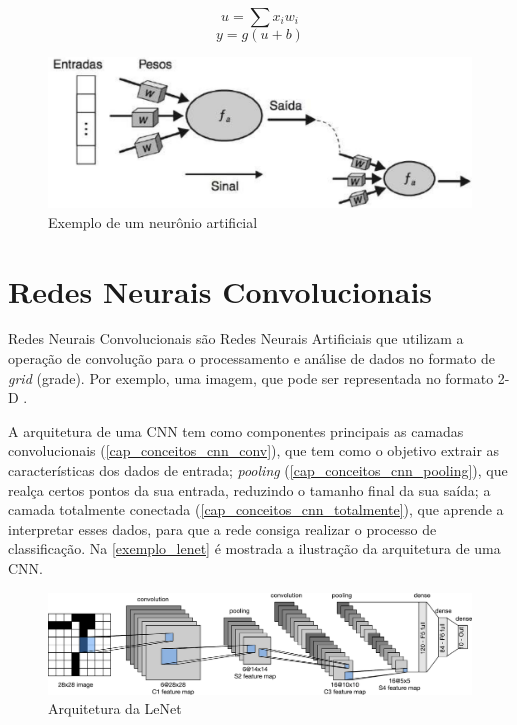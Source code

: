 \begin{equation}\label{eq_neuronio}
u = \sum x_i w_i
\end{equation}
\begin{equation}\label{eq_ativacao}
y = g(u + b)
\end{equation}

\begin{figure}[htb]
	\begin{center}
		\includegraphics[scale=0.3]{Imagens/exemplo_neuronio_artificial}
	\end{center}
	\caption {\label{cap_conceitos_ex_neuronio} Exemplo de um neurônio artificial}
\end{figure}

\section{Redes Neurais Convolucionais}\label{cap_conceitos_cnn}
Redes Neurais Convolucionais são Redes Neurais Artificiais que utilizam a operação de convolução para o processamento e
análise de dados no formato de \textit{grid} (grade).
Por exemplo, uma imagem, que pode ser representada no formato 2-D \cite{Goodfellow-et-al-2016}.

A arquitetura de uma CNN tem como componentes principais as camadas convolucionais (\autoref{cap_conceitos_cnn_conv}),
que tem como o objetivo extrair as características dos dados de entrada;
\textit{pooling} (\autoref{cap_conceitos_cnn_pooling}), que realça certos pontos da sua entrada, reduzindo o tamanho
final da sua saída;
a camada totalmente conectada (\autoref{cap_conceitos_cnn_totalmente}), que aprende a interpretar esses dados,
para que a rede consiga realizar o processo de classificação.
Na \autoref{exemplo_lenet} é mostrada a ilustração da arquitetura de uma CNN.

\begin{figure}[htb]
	\begin{center}
		\includegraphics[scale=0.5]{Imagens/lenet}
	\end{center}
	\caption {\label{exemplo_lenet} Arquitetura da LeNet}
\end{figure}

